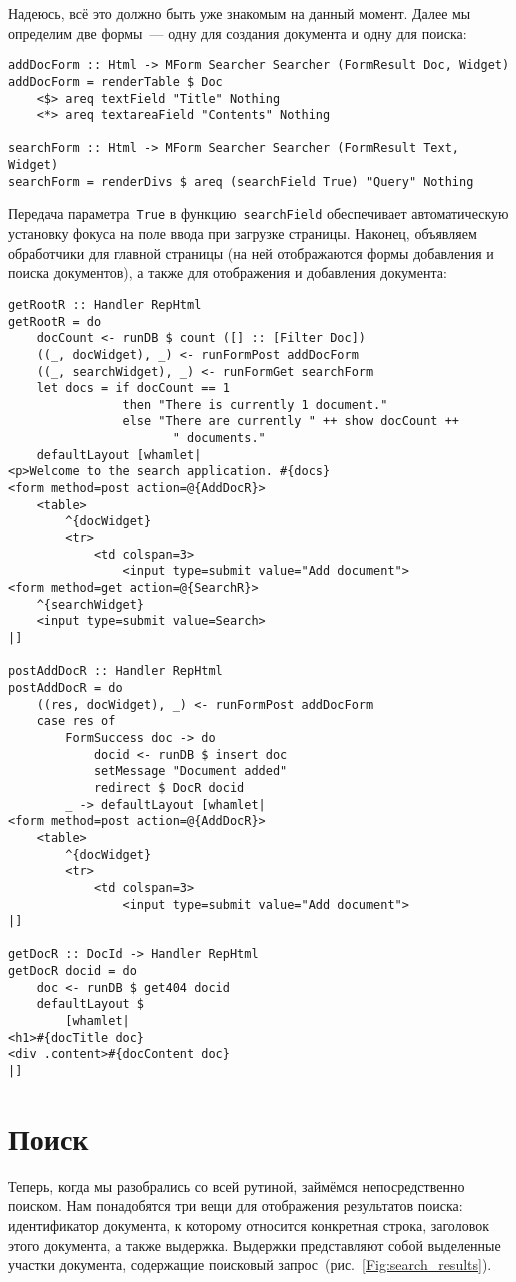 Надеюсь, всё это должно быть уже знакомым на данный момент. Далее мы определим две формы~--- одну для создания документа и одну для поиска:
\begin{lstlisting}
addDocForm :: Html -> MForm Searcher Searcher (FormResult Doc, Widget)
addDocForm = renderTable $ Doc
    <$> areq textField "Title" Nothing
    <*> areq textareaField "Contents" Nothing

searchForm :: Html -> MForm Searcher Searcher (FormResult Text, Widget)
searchForm = renderDivs $ areq (searchField True) "Query" Nothing
\end{lstlisting}%

Передача параметра~\lstinline'True' в функцию~\lstinline'searchField' обеспечивает автоматическую установку фокуса на поле ввода при загрузке страницы. Наконец, объявляем обработчики для главной страницы (на ней отображаются формы добавления и поиска документов), а также для отображения и добавления документа:
\begin{lstlisting}
getRootR :: Handler RepHtml
getRootR = do
    docCount <- runDB $ count ([] :: [Filter Doc])
    ((_, docWidget), _) <- runFormPost addDocForm
    ((_, searchWidget), _) <- runFormGet searchForm
    let docs = if docCount == 1
                then "There is currently 1 document."
                else "There are currently " ++ show docCount ++
                       " documents."
    defaultLayout [whamlet|
<p>Welcome to the search application. #{docs}
<form method=post action=@{AddDocR}>
    <table>
        ^{docWidget}
        <tr>
            <td colspan=3>
                <input type=submit value="Add document">
<form method=get action=@{SearchR}>
    ^{searchWidget}
    <input type=submit value=Search>
|]

postAddDocR :: Handler RepHtml
postAddDocR = do
    ((res, docWidget), _) <- runFormPost addDocForm
    case res of
        FormSuccess doc -> do
            docid <- runDB $ insert doc
            setMessage "Document added"
            redirect $ DocR docid
        _ -> defaultLayout [whamlet|
<form method=post action=@{AddDocR}>
    <table>
        ^{docWidget}
        <tr>
            <td colspan=3>
                <input type=submit value="Add document">
|]

getDocR :: DocId -> Handler RepHtml
getDocR docid = do
    doc <- runDB $ get404 docid
    defaultLayout $
        [whamlet|
<h1>#{docTitle doc}
<div .content>#{docContent doc}
|]
\end{lstlisting}%

\section{Поиск}
Теперь, когда мы разобрались со всей рутиной, займёмся непосредственно поиском. Нам понадобятся три вещи для отображения результатов поиска: идентификатор документа, к которому относится конкретная строка, заголовок этого документа, а также выдержка. Выдержки представляют собой выделенные участки документа, содержащие поисковый запрос~(рис.~\ref{Fig:search_results}).


